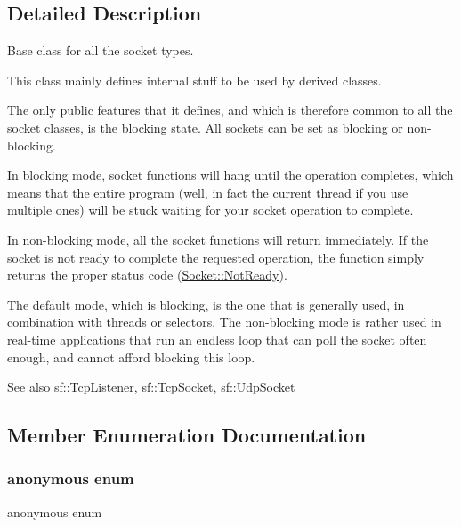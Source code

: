 \subsection{Detailed Description}
Base class for all the socket types. 

\begin{DoxyVerb}\end{DoxyVerb}


This class mainly defines internal stuff to be used by derived classes.

The only public features that it defines, and which is therefore common to all the socket classes, is the blocking state. All sockets can be set as blocking or non-\/blocking.

In blocking mode, socket functions will hang until the operation completes, which means that the entire program (well, in fact the current thread if you use multiple ones) will be stuck waiting for your socket operation to complete.

In non-\/blocking mode, all the socket functions will return immediately. If the socket is not ready to complete the requested operation, the function simply returns the proper status code (\mbox{\hyperlink{classsf_1_1_socket_a51bf0fd51057b98a10fbb866246176dca8554848daae98f996e131bdeed076c09}{Socket\+::\+Not\+Ready}}).

The default mode, which is blocking, is the one that is generally used, in combination with threads or selectors. The non-\/blocking mode is rather used in real-\/time applications that run an endless loop that can poll the socket often enough, and cannot afford blocking this loop.

\begin{DoxySeeAlso}{See also}
\mbox{\hyperlink{classsf_1_1_tcp_listener}{sf\+::\+Tcp\+Listener}}, \mbox{\hyperlink{classsf_1_1_tcp_socket}{sf\+::\+Tcp\+Socket}}, \mbox{\hyperlink{classsf_1_1_udp_socket}{sf\+::\+Udp\+Socket}} \begin{DoxyVerb}\end{DoxyVerb}
 
\end{DoxySeeAlso}


\subsection{Member Enumeration Documentation}
\mbox{\label{classsf_1_1_socket_aa3e6c984bcb81a35234dcc9cc8369d75}} 
\subsubsection{\texorpdfstring{anonymous enum}{anonymous enum}}
{\footnotesize\ttfamily anonymous enum}



